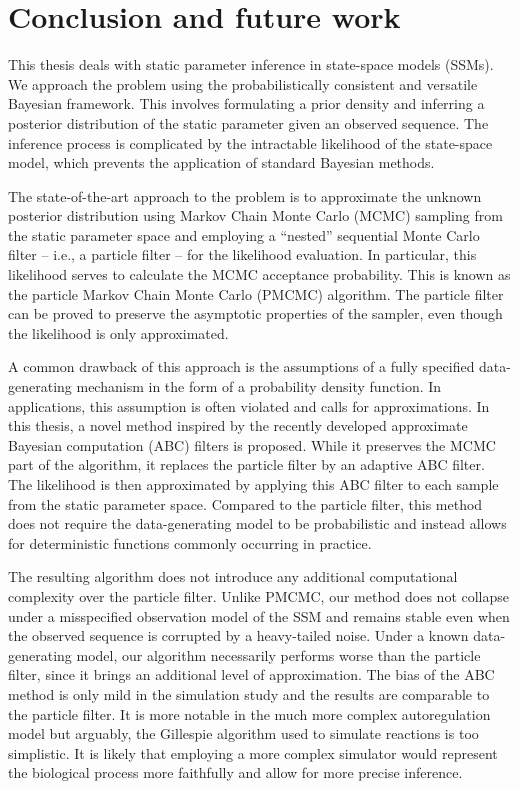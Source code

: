 \chapter{Conclusion and future work}
\label{chap:conclusion}

This thesis deals with static parameter inference in state-space models (SSMs). We approach the problem using the probabilistically consistent and versatile Bayesian framework. This involves formulating a prior density and inferring a posterior distribution of the static parameter given an observed sequence. The inference process is complicated by the intractable likelihood of the state-space model, which prevents the application of standard Bayesian methods.

The state-of-the-art approach to the problem is to approximate the unknown posterior distribution using Markov Chain Monte Carlo (MCMC) sampling from the static parameter space and employing a ``nested'' sequential Monte Carlo filter -- i.e., a particle filter -- for the likelihood evaluation. In particular, this likelihood serves to calculate the MCMC acceptance probability. This is known as the particle Markov Chain Monte Carlo (PMCMC) algorithm. The particle filter can be proved to preserve the asymptotic properties of the sampler, even though the likelihood is only approximated.

A common drawback of this approach is the assumptions of a fully specified data-generating mechanism in the form of a probability density function. In applications, this assumption is often violated and calls for approximations. In this thesis, a novel method inspired by the recently developed approximate Bayesian computation (ABC) filters is proposed. While it preserves the MCMC part of the algorithm, it replaces the particle filter by an adaptive ABC filter. The likelihood is then approximated by applying this ABC filter to each sample from the static parameter space. Compared to the particle filter, this method does not require the data-generating model to be probabilistic and instead allows for deterministic functions commonly occurring in practice.

The resulting algorithm does not introduce any additional computational complexity over the particle filter. Unlike PMCMC, our method does not collapse under a misspecified observation model of the SSM and remains stable even when the observed sequence is corrupted by a heavy-tailed noise. Under a known data-generating model, our algorithm necessarily performs worse than the particle filter, since it brings an additional level of approximation. The bias of the ABC method is only mild in the simulation study and the results are comparable to the particle filter. It is more notable in the much more complex autoregulation model but arguably, the Gillespie algorithm used to simulate reactions is too simplistic. It is likely that employing a more complex simulator would represent the biological process more faithfully and allow for more precise inference.


